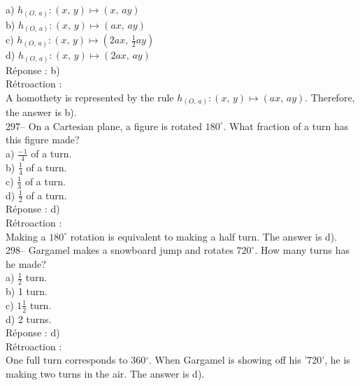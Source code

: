 \documentclass[letterpaper, 12pt]{article}
\begin{document}
a) $h_{\left( O,\,a\right)} :\left( x,\,y\right) \longmapsto
\left(x,\,ay\right) $ \\
b) $h_{\left( O,\,a\right)} :\left( x,\,y\right) \longmapsto
\left(ax,\,ay\right) $ \\
c) $h_{\left( O,\,a\right)} :\left( x,\,y\right) \longmapsto
\left(2ax,\,\frac{1}{2}ay\right) $ \\
d) $h_{\left( O,\,a\right)} :\left( x,\,y\right) \longmapsto
\left(2ax,\,ay\right) $ \\

R\'eponse : b)\\

R\'etroaction : \\
A homothety is represented by the rule $h_{\left( O,\,a\right)}
:\left(
x,\,y\right) \longmapsto \left(ax,\,ay\right)$. Therefore, the answer is b).\\


297-- On a Cartesian plane, a figure is rotated
$180^{\circ}$.  What fraction of a turn has this figure made?\\

a) $\frac{-1}{4}$ of a turn.\\[2mm]
b) $\frac{1}{4}$ of a turn.\\[2mm]
c) $\frac{1}{3}$ of a turn.\\[2mm]
d) $\frac{1}{2}$ of a turn.\\

R\'eponse : d)\\

R\'etroaction : \\
Making a $180^{\circ}$ rotation is equivalent to making a half
turn. The answer is d).\\

298--  Gargamel makes a snowboard jump and rotates
$720^{\circ}$. How many turns has he made?\\

a) $\frac{1}{2}$ turn.\\[2mm]
b) 1 turn.\\[2mm]
c) $1\frac{1}{2}$ turn.\\[2mm]
d) 2 turns.\\

R\'eponse : d)\\

R\'etroaction :\\
One full turn corresponds to 360$^{\circ}$.  When Gargamel is
showing off his '720', he is making two turns in the air. The answer is d).\\
\end{document}
